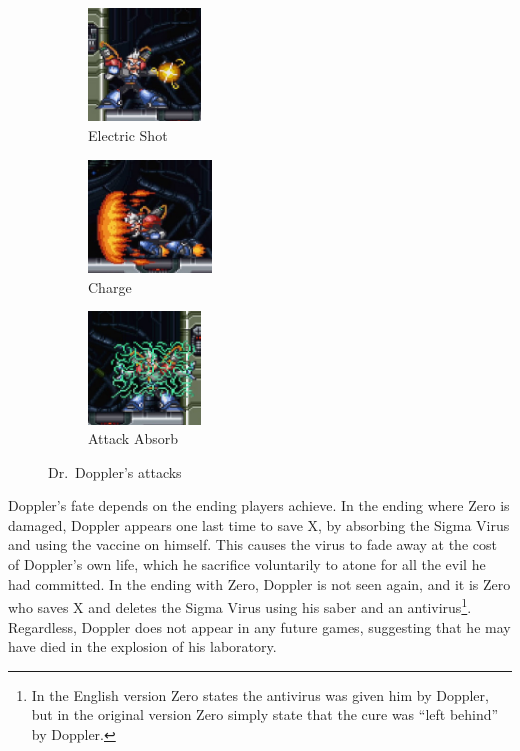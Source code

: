 \begin{figure}[htp]
	\centering
		\begin{subfigure}{.3\linewidth}
		\centering
		\includegraphics[height=3cm]{figures/X3/Doppler_stages/doppler_spark.jpg}
		\caption{Electric Shot}
	\end{subfigure}
	\begin{subfigure}{.3\linewidth}
		\centering
		\includegraphics[height=3cm]{figures/X3/Doppler_stages/doppler_dash.jpg}
		\caption{Charge}
	\end{subfigure}
	\begin{subfigure}{.3\linewidth}
		\centering
		\includegraphics[height=3cm]{figures/X3/Doppler_stages/doppler_barrier.jpg}
		\caption{Attack Absorb}
	\end{subfigure}
	\caption{Dr.~Doppler's attacks}
\end{figure}

Doppler's fate depends on the ending players achieve. In the ending where Zero is damaged, Doppler appears one last time to save X, by absorbing the Sigma Virus and using the vaccine on himself. This causes the virus to fade away at the cost of Doppler's own life, which he sacrifice voluntarily to atone for all the evil he had committed. In the ending with Zero, Doppler is not seen again, and it is Zero who saves X and deletes the Sigma Virus using his saber and an antivirus\footnote{In the English version Zero states the antivirus was given him by Doppler, but in the original version Zero simply state that the cure was ``left behind'' by Doppler.}. Regardless, Doppler does not appear in any future games, suggesting that he may have died in the explosion of his laboratory.



